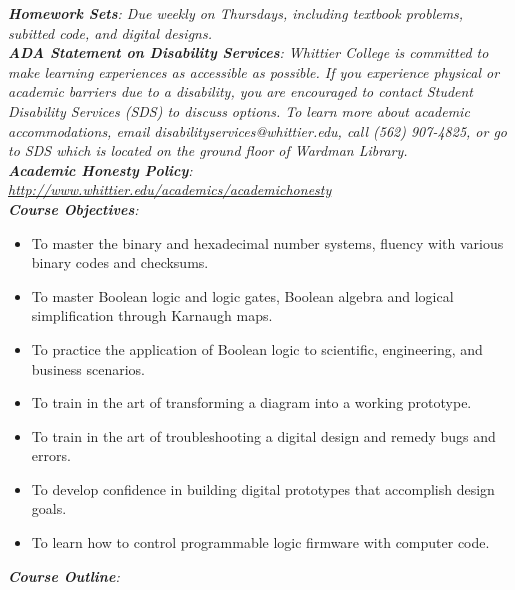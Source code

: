 \documentclass[10pt]{article}
\begin{document}
\textit{\textbf{Homework Sets}: Due weekly on Thursdays, including textbook problems, subitted code, and digital designs.} \\
\textit{\textbf{ADA Statement on Disability Services}: Whittier College is committed to make learning experiences as accessible as possible. If you experience physical or academic barriers due to a disability, you are encouraged to contact Student Disability Services (SDS) to discuss options. To learn more about academic accommodations, email disabilityservices@whittier.edu, call (562) 907-4825, or go to SDS which is located on the ground floor of Wardman Library.} \\
\textit{\textbf{Academic Honesty Policy}: \url{http://www.whittier.edu/academics/academichonesty}} \\
\textit{\textbf{Course Objectives}:}
\begin{itemize}
\item To master the binary and hexadecimal number systems, fluency with various binary codes and checksums.
\item To master Boolean logic and logic gates, Boolean algebra and logical simplification through Karnaugh maps.
\item To practice the application of Boolean logic to scientific, engineering, and business scenarios.
\item To train in the art of transforming a diagram into a working prototype.
\item To train in the art of troubleshooting a digital design and remedy bugs and errors.
\item To develop confidence in building digital prototypes that accomplish design goals.
\item To learn how to control programmable logic firmware with computer code.
\end{itemize}
\clearpage
\textit{\textbf{Course Outline}:}
\end{document}
